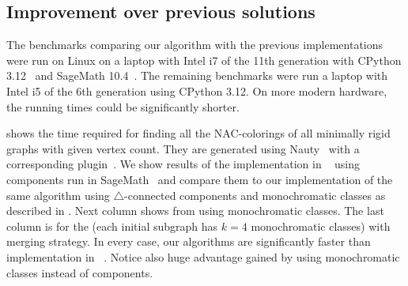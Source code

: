 \subsection{Improvement over previous solutions}

The benchmarks comparing our algorithm with the previous implementations
were run on Linux on a laptop with Intel i7 of the 11th generation
with CPython 3.12~\cite{cpython} and SageMath 10.4~\cite{sagemath}.
The remaining benchmarks were run a laptop with Intel i5 of the 6th generation
using CPython 3.12.
On more modern hardware, the running times could be significantly shorter.

shows the time required for finding all the NAC-colorings
of all minimally rigid graphs with given vertex count.
%
They are generated using Nauty~\cite{nauty}
with a corresponding plugin~\cite{nauty_plugin}.
%
We show results of the implementation
in \flexrilog{}~\cite{flexrilog} using \trcon{} components
run in SageMath~\cite{sagemath}
and compare them to our implementation of the same \Naive{} algorithm
using $\triangle$-connected components
and monochromatic classes as described in .
Next column shows \NaiveCycles{} from 
using monochromatic classes.
The last column is for the \NeighborsDegree{} (each initial subgraph has $k=4$ monochromatic classes)
with \MergeLinear{} merging strategy.
%
In every case, our algorithms are significantly faster than implementation in \flexrilog{}~\cite{flexrilog}.
Notice also huge advantage gained by using monochromatic classes instead of \trcon{} components.
%
